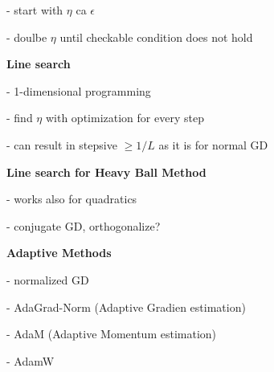 - start with $\eta$ ca $\epsilon$

- doulbe $\eta$ until checkable condition does not hold

\textbf{Line search}

- 1-dimensional programming

- find $\eta$ with optimization for every step

- can result in stepsive $\ge 1/L$ as it is for normal GD

\textbf{Line search for Heavy Ball Method}

- works also for quadratics

- conjugate  GD, orthogonalize?

\textbf{Adaptive Methods}

- normalized GD

- AdaGrad-Norm (Adaptive Gradien estimation)

- AdaM (Adaptive Momentum estimation)

- AdamW

